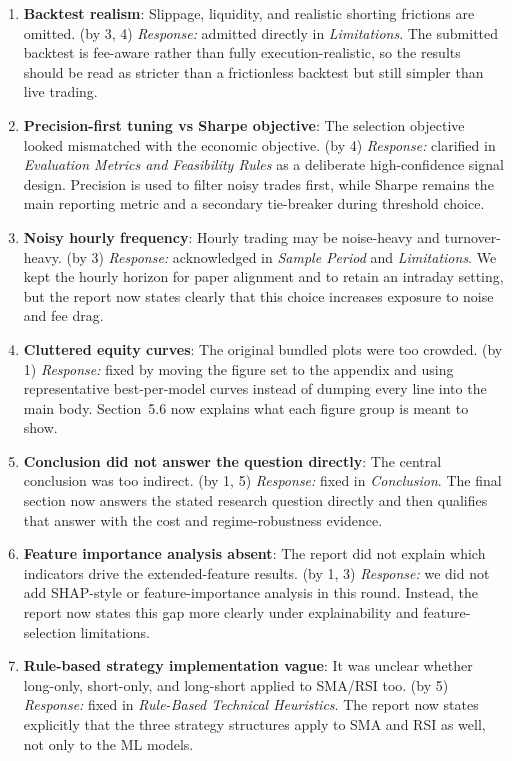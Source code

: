 \documentclass[12pt]{article}
\begin{document}
\begin{enumerate}[leftmargin=1.5em]
    \item \textbf{Backtest realism}: Slippage, liquidity, and realistic shorting frictions are omitted. (by 3, 4) \textit{Response:} admitted directly in \emph{Limitations}. The submitted backtest is fee-aware rather than fully execution-realistic, so the results should be read as stricter than a frictionless backtest but still simpler than live trading.
    \item \textbf{Precision-first tuning vs Sharpe objective}: The selection objective looked mismatched with the economic objective. (by 4) \textit{Response:} clarified in \emph{Evaluation Metrics and Feasibility Rules} as a deliberate high-confidence signal design. Precision is used to filter noisy trades first, while Sharpe remains the main reporting metric and a secondary tie-breaker during threshold choice.
    \item \textbf{Noisy hourly frequency}: Hourly trading may be noise-heavy and turnover-heavy. (by 3) \textit{Response:} acknowledged in \emph{Sample Period} and \emph{Limitations}. We kept the hourly horizon for paper alignment and to retain an intraday setting, but the report now states clearly that this choice increases exposure to noise and fee drag.
    \item \textbf{Cluttered equity curves}: The original bundled plots were too crowded. (by 1) \textit{Response:} fixed by moving the figure set to the appendix and using representative best-per-model curves instead of dumping every line into the main body. Section~5.6 now explains what each figure group is meant to show.
    \item \textbf{Conclusion did not answer the question directly}: The central conclusion was too indirect. (by 1, 5) \textit{Response:} fixed in \emph{Conclusion}. The final section now answers the stated research question directly and then qualifies that answer with the cost and regime-robustness evidence.
    \item \textbf{Feature importance analysis absent}: The report did not explain which indicators drive the extended-feature results. (by 1, 3) \textit{Response:} we did not add SHAP-style or feature-importance analysis in this round. Instead, the report now states this gap more clearly under explainability and feature-selection limitations.
    \item \textbf{Rule-based strategy implementation vague}: It was unclear whether long-only, short-only, and long-short applied to SMA/RSI too. (by 5) \textit{Response:} fixed in \emph{Rule-Based Technical Heuristics}. The report now states explicitly that the three strategy structures apply to SMA and RSI as well, not only to the ML models.

\end{enumerate}
\end{document}
